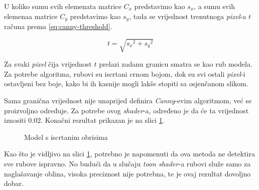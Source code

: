 U koliko sumu svih elemenata matrice $C_x$ predstavimo kao $s_x$, a sumu svih elemenaa matrice $C_y$ predstavimo kao $s_y$, tada se vrijednost trenutnoga \emph{pixel}-a $t$ računa prema \ref{eq:canny-threshold}.

\begin{equation}
\label{eq:canny-threshold}
	t = \sqrt{{s_x}^2 + {s_y}^2}
\end{equation}

Za svaki \emph{pixel} čija vrijednost $t$ prelazi zadanu granicu smatra se kao rub modela. Za potrebe algoritma, rubovi su iscrtani crnom bojom, dok su svi ostali \emph{pixel}-i ostavljeni bez boje, kako bi ih kasnije mogli lakše stopiti sa osjenčanom slikom.

Sama granična vrijednost nije unaprijed definira \emph{Canny}-evim algoritmom, već se proizvoljno određuje. Za potrebe ovog \emph{shader}-a, određeno je da će ta vrijednost iznositi $0.02$. Konačni rezultat prikazan je na slici \ref{fig:monkey-edges}.

\begin{figure}[H]
\centering{}
\caption{Model s iscrtanim obrisima}
\label{fig:monkey-edges}
\end{figure}

Kao što je vidljivo na slici \ref{fig:monkey-edges}, potrebno je napomenuti da ova metoda ne detektira sve rubove ispravno. No budući da u slučaju \emph{toon shader}-a rubovi služe samo za naglašavanje oblina, visoka preciznost nije potrebna, te je ovaj rezultat dovoljno dobar.

